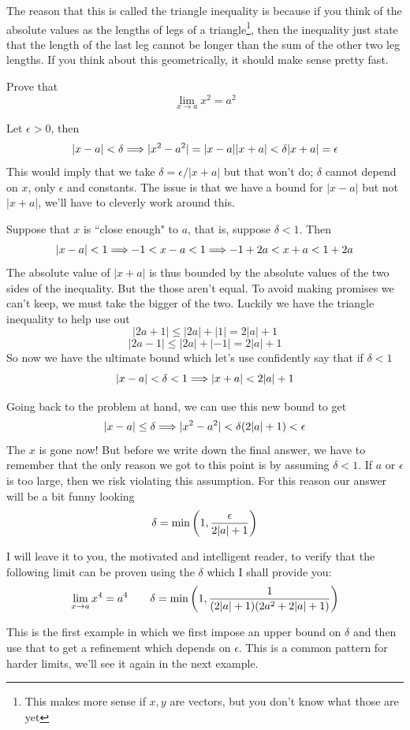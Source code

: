 The reason that this is called the triangle inequality is because if you think of the absolute values as the lengths of legs of a triangle\footnote{This makes more sense if $x, y$ are vectors, but you don't know what those are yet}, then the inequality just state that the length of the last leg cannot be longer than the sum of the other two leg lengths. If you think about this geometrically, it should make sense pretty fast.

\begin{example}
	Prove that
	\[ \lim_{x \to a} x^2 = a^2 \]
	
	Let $\epsilon > 0$, then
	\[ |x - a| < \delta \Longrightarrow |x^2 - a^2| = |x - a||x + a| < \delta |x + a| = \epsilon \]
	This would imply that we take $\delta = \epsilon / |x + a|$ but that won't do; $\delta$ cannot depend on $x$, only $\epsilon$ and constants. The issue is that we have a bound for $|x - a|$ but not $|x + a|$, we'll have to cleverly work around this. 
	
	Suppose that $x$ is ``close enough" to $a$, that is, suppose $\delta < 1$. Then
	\[ |x - a| < 1 \Longrightarrow -1 < x - a < 1 \Longrightarrow -1 + 2a < x + a < 1 + 2a \]
	The absolute value of $|x + a|$ is thus bounded by the absolute values of the two sides of the inequality. But the those aren't equal. To avoid making promises we can't keep, we must take the bigger of the two. Luckily we have the triangle inequality to help use out
	\[ |2a + 1| \leq |2a| + |1| = 2|a| + 1 \]
	\[ |2a - 1| \leq |2a| + |-1| = 2|a| + 1 \]
	So now we have the ultimate bound which let's use confidently say that if $\delta < 1$
	\[ |x - a| < \delta < 1 \Longrightarrow |x + a| < 2|a| + 1 \]
	
	Going back to the problem at hand, we can use this new bound to get
	\[ |x - a| \leq \delta \Longrightarrow |x^2 - a^2| < \delta (2|a| + 1) < \epsilon \]
	The $x$ is gone now! But before we write down the final answer, we have to remember that the only reason we got to this point is by assuming $\delta < 1$. If $a$ or $\epsilon$ is too large, then we risk violating this assumption. For this reason our answer will be a bit funny looking
	\[ \delta = \min\qty(1, \frac{\epsilon}{2|a| + 1}) \]
	
	I will leave it to you, the motivated and intelligent reader, to verify that the following limit can be proven using the $\delta$ which I shall provide you:
	\[ \lim_{x \to a} x^4 = a^4 \qquad \delta = \min\qty(1, \frac{1}{(2|a| + 1)(2a^2 + 2|a| + 1)}) \]
\end{example}

This is the first example in which we first impose an upper bound on $\delta$ and then use that to get a refinement which depends on $\epsilon$. This is a common pattern for harder limits, we'll see it again in the next example.

